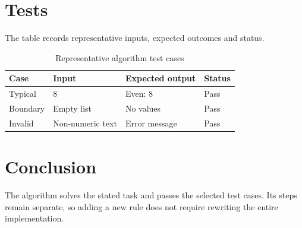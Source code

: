 \documentclass[12pt]{article}
\begin{document}
  \section{Tests}
  The table records representative inputs, expected outcomes and status.

  \begin{table}[H]
    \centering
    \caption{Representative algorithm test cases}
    \begin{tabular}{@{}llll@{}}
      \toprule
      Case & Input & Expected output & Status \\
      \midrule
      Typical & 8 & Even: 8 & Pass \\
      Boundary & Empty list & No values & Pass \\
      Invalid & Non-numeric text & Error message & Pass \\
      \bottomrule
    \end{tabular}
  \end{table}

  \section{Conclusion}
  The algorithm solves the stated task and passes the selected test cases.
  Its steps remain separate, so adding a new rule does not require rewriting
  the entire implementation.
\end{document}
